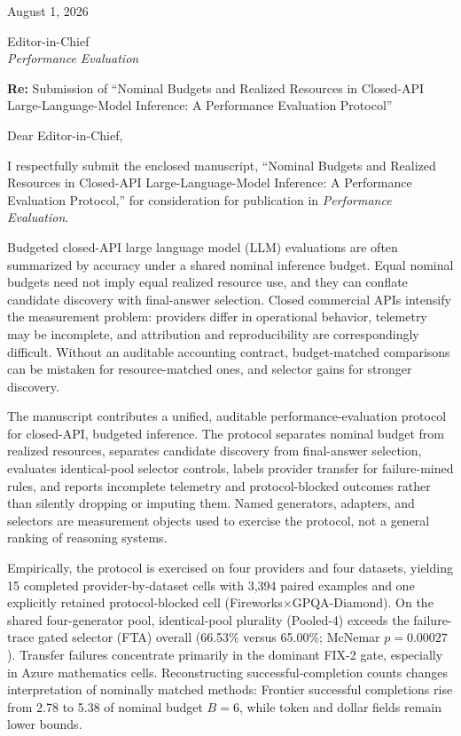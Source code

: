 \documentclass[10pt]{article}
\begin{document}
\noindent
August 1, 2026

\vspace{0.25em}
\noindent
Editor-in-Chief\\
\textit{Performance Evaluation}

\vspace{0.25em}
\noindent
\textbf{Re:} Submission of ``Nominal Budgets and Realized Resources in Closed-API Large-Language-Model Inference: A Performance Evaluation Protocol''

\vspace{0.25em}
\noindent
Dear Editor-in-Chief,

I respectfully submit the enclosed manuscript, ``Nominal Budgets and Realized Resources in Closed-API Large-Language-Model Inference: A Performance Evaluation Protocol,'' for consideration for publication in \textit{Performance Evaluation}.

Budgeted closed-API large language model (LLM) evaluations are often summarized by accuracy under a shared nominal inference budget. Equal nominal budgets need not imply equal realized resource use, and they can conflate candidate discovery with final-answer selection. Closed commercial APIs intensify the measurement problem: providers differ in operational behavior, telemetry may be incomplete, and attribution and reproducibility are correspondingly difficult. Without an auditable accounting contract, budget-matched comparisons can be mistaken for resource-matched ones, and selector gains for stronger discovery.

The manuscript contributes a unified, auditable performance-evaluation protocol for closed-API, budgeted inference. The protocol separates nominal budget from realized resources, separates candidate discovery from final-answer selection, evaluates identical-pool selector controls, labels provider transfer for failure-mined rules, and reports incomplete telemetry and protocol-blocked outcomes rather than silently dropping or imputing them. Named generators, adapters, and selectors are measurement objects used to exercise the protocol, not a general ranking of reasoning systems.

Empirically, the protocol is exercised on four providers and four datasets, yielding 15 completed provider-by-dataset cells with 3{,}394 paired examples and one explicitly retained protocol-blocked cell (Fireworks$\times$GPQA-Diamond). On the shared four-generator pool, identical-pool plurality (Pooled-4) exceeds the failure-trace gated selector (FTA) overall (66.53\% versus 65.00\%; McNemar $p{=}0.00027$). Transfer failures concentrate primarily in the dominant FIX-2 gate, especially in Azure mathematics cells. Reconstructing successful-completion counts changes interpretation of nominally matched methods: Frontier successful completions rise from 2.78 to 5.38 of nominal budget $B{=}6$, while token and dollar fields remain lower bounds.
\end{document}
